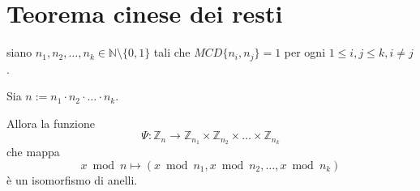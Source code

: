 \documentclass[10pt,a4paper,twoside]{book}
\begin{document}
\newpage

\section{Teorema cinese dei resti}
\begin{theorem}
    siano $n_1,n_2,\ldots,n_k \in \mathbb{N} \setminus \{0,1\}$ tali che $MCD \{n_i,n_j\} = 1$ per ogni $1 \leq i,j \leq k, i \neq j$.

    Sia $n := n_1 \cdot n_2 \cdot \ldots \cdot n_k$.

    Allora la funzione
    \begin{equation*}
        \Psi : \mathbb{Z}_n \rightarrow \mathbb{Z}_{n_1} \times \mathbb{Z}_{n_2} \times \ldots \times \mathbb{Z}_{n_k}
    \end{equation*}
    che mappa
    \begin{equation*}
        x \bmod n \mapsto (x \bmod n_1, x \bmod n_2, \ldots, x \bmod n_k)
    \end{equation*}
    è un isomorfismo di anelli.
\end{theorem}
\end{document}
